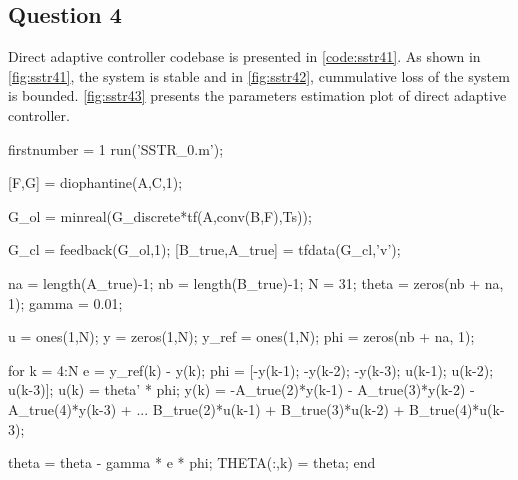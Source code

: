 \FloatBarrier
\subsection{Question 4}
Direct adaptive controller codebase is presented in \autoref{code:sstr41}. As shown in \autoref{fig:sstr41}, the system is stable and in \autoref{fig:sstr42}, cummulative loss of the system is bounded. \autoref{fig:sstr43} presents the parameters estimation plot of direct adaptive controller.

\begin{code}
	\begin{matlabcode}{firstnumber = 1}
run('SSTR_0.m');

[F,G] = diophantine(A,C,1);

G_ol = minreal(G_discrete*tf(A,conv(B,F),Ts));

G_cl = feedback(G_ol,1);
[B_true,A_true] = tfdata(G_cl,'v');

na = length(A_true)-1; nb = length(B_true)-1;
N = 31;              
theta = zeros(nb + na, 1);  
gamma = 0.01;          

u = ones(1,N);
y = zeros(1,N);
y_ref = ones(1,N);
phi = zeros(nb + na, 1);

for k = 4:N
e = y_ref(k) - y(k);  
phi = [-y(k-1); -y(k-2); -y(k-3); u(k-1); u(k-2); u(k-3)];
u(k) = theta' * phi;
y(k) = -A_true(2)*y(k-1) - A_true(3)*y(k-2) - A_true(4)*y(k-3) + ...
B_true(2)*u(k-1) + B_true(3)*u(k-2) + B_true(4)*u(k-3);

theta = theta - gamma * e * phi;
THETA(:,k) = theta; 
end
	\end{matlabcode}
	\label{code:sstr41}
\end{code}

